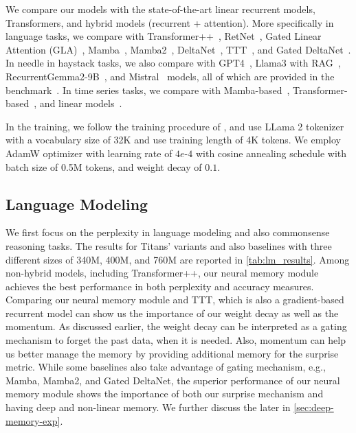 We compare our models with the state-of-the-art linear recurrent models, Transformers, and hybrid models (recurrent + attention). More specifically in language tasks, we compare with Transformer++~\citep{touvron2023llama}, RetNet~\citep{sun2023retentive}, Gated Linear Attention (GLA)~\citep{yang2024gatedattn}, Mamba~\citep{gu2024mamba}, Mamba2~\citep{dao2024transformers}, DeltaNet~\citep{yang2024parallelizing}, TTT~\citep{sun2024learning}, and Gated DeltaNet~\citep{yang2024gated}. In needle in haystack tasks, we also compare with GPT4~\citep{achiam2023gpt}, Llama3 with RAG~\citep{touvron2023llama}, RecurrentGemma2-9B~\citep{botev2024recurrentgemma}, and Mistral~\citep{jiang2023mistral} models, all of which are provided in the benchmark~\citep{kuratov2024babilong}. In time series tasks, we compare with Mamba-based~\citep{behrouz2024mambamixer}, Transformer-based~\citep{nie2022time, liu2023itransformer, zhang2023crossformer}, and linear models~\citep{das2023longterm, wu2023timesnet, zeng2023transformers, li2023revisiting}. 

In the training, we follow the training procedure of \citet{yang2024gated}, and use LLama 2 tokenizer with a vocabulary size of 32K and use training length of 4K tokens. We employ AdamW optimizer with learning rate of $4e$-$4$ with cosine annealing schedule with batch size of 0.5M tokens, and weight decay of $0.1$.   


\subsection{Language Modeling}\label{sec:exp-lm}
We first focus on the perplexity in language modeling and also commonsense reasoning tasks. The results for Titans' variants and also baselines with three different sizes of 340M, 400M, and 760M are reported in \autoref{tab:lm_results}. Among non-hybrid models, including Transformer++, our neural memory module achieves the best performance in both perplexity and accuracy measures. Comparing our neural memory module and TTT, which is also a gradient-based recurrent model can show us the importance of our weight decay as well as the momentum. As discussed earlier, the weight decay can be interpreted as a gating mechanism to forget the past data, when it is needed. Also, momentum can help us better manage the memory by providing additional memory for the surprise metric. While some baselines also take advantage of gating mechanism, e.g., Mamba, Mamba2, and Gated DeltaNet, the superior performance of our neural memory module shows the importance of both our surprise mechanism and having deep and non-linear memory. We further discuss the later in \autoref{sec:deep-memory-exp}. 

